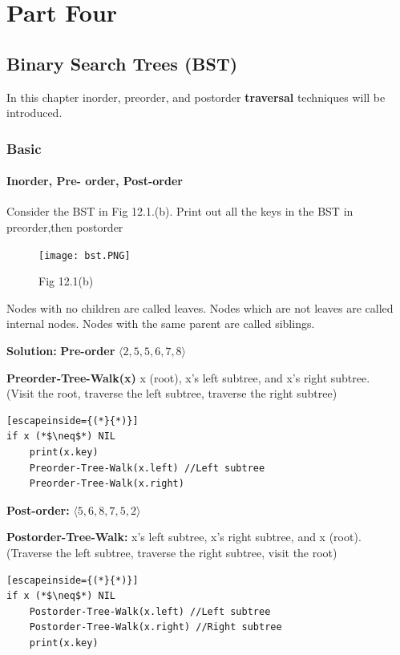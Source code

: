 \documentclass[11pt,fleqn]{book}
\begin{document}
\part{Part Four}

\chapter{Binary Search Trees (BST)}
In this chapter inorder, preorder, and postorder \textbf{traversal} techniques will be introduced. 
\section{Basic}
\subsection{Inorder, Pre- order, Post-order}
 \vspace{1em}
\begin{example}
 Consider the BST in Fig 12.1.(b).  Print out all the keys in the BST in preorder,then postorder
 \begin{figure}[h!]
     \centering
     \texttt{[image: bst.PNG]}
     \caption{Fig 12.1(b)}
     \label{fig:my_label}
 \end{figure}
\end{example}
\vspace{1em}
\begin{remark}
Nodes with no children are called leaves. Nodes which are not leaves are called internal nodes. Nodes with the same parent are called siblings. 
\end{remark}
\vspace{1em}
\textbf{Solution:} 
\textbf{Pre-order} $\langle 2,5,5,6,7,8\rangle$
\begin{definition}
\textbf{Preorder-Tree-Walk(x) } x (root), x's left subtree, and x's right subtree. \\
(Visit the root, traverse the left subtree, traverse the right subtree)
\begin{lstlisting}[escapeinside={(*}{*)}]
if x (*$\neq$*) NIL 
    print(x.key)
    Preorder-Tree-Walk(x.left) //Left subtree
    Preorder-Tree-Walk(x.right)
\end{lstlisting}
\end{definition}
\textbf{Post-order:} $\langle 5,6,8,7,5,2\rangle$
\begin{definition}
\textbf{Postorder-Tree-Walk: } x's left subtree, x's right subtree, and x (root).\\
(Traverse the left subtree, traverse the right subtree, visit the root)
\begin{lstlisting}[escapeinside={(*}{*)}]
if x (*$\neq$*) NIL
    Postorder-Tree-Walk(x.left) //Left subtree
    Postorder-Tree-Walk(x.right) //Right subtree
    print(x.key)
\end{lstlisting}
\end{definition}
\end{document}
